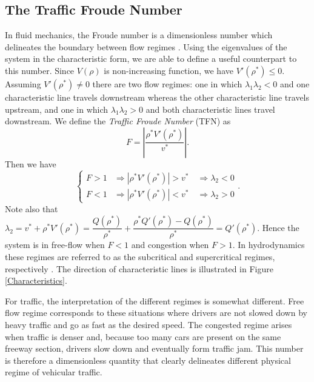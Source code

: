 \documentclass[5p,twocolumn]{elsarticle}
\begin{document}
\subsection{The Traffic Froude Number}
In fluid mechanics, the Froude number is a dimensionless number which delineates the boundary between flow regimes \cite{Sturm, litrico2009modeling}. Using the eigenvalues of the system in the characteristic form, we are able to define a useful counterpart to this number.
Since $V(\rho)$ is non-increasing function, we have $V'(\rho^*) \leq 0$. Assuming $V'(\rho^*) \neq 0$ there are two flow regimes: one in which $\lambda_1 \lambda_2 < 0$ and one characteristic line travels downstream whereas the other characteristic line travels upstream, and one in which $\lambda_1 \lambda_2 > 0$ and both characteristic lines travel downstream. We define the \textit{Traffic Froude Number} (TFN) as
\begin{equation}
F = \left\lvert\dfrac{\rho^*V'( \rho^*)}{v^*}\right\rvert.
\end{equation}
Then we have
\begin{equation*}
\begin{cases}
F > 1 &\Rightarrow |\rho^*V'(\rho^*)| > v^* \quad \Rightarrow \lambda_2  <0 \\
F < 1 &\Rightarrow |\rho^*V'(\rho^*)| < v^* \quad \Rightarrow \lambda_2 > 0
\end{cases}.
\end{equation*}
Note also that $\lambda_2 = v^* + \rho^* V'( \rho^*) = \dfrac{Q(\rho^*)}{\rho^*} + \dfrac{\rho^*Q'(\rho^*)-Q(\rho^*)}{\rho^*} = Q'(\rho^*)$. Hence the system is in free-flow when $F<1$ and congestion when $F>1$. In hydrodynamics these regimes are referred to as the subcritical and supercritical regimes, respectively \cite{litrico2009modeling}. The direction of characteristic lines is illustrated in Figure \ref{Characteristics}.

For traffic, the interpretation of the different regimes is somewhat different. Free flow regime corresponds to these situations where drivers are not slowed down by heavy traffic and go as fast as the desired speed. The congested regime arises when traffic is denser and, because too many cars are present on the same freeway section, drivers slow down and eventually form traffic jam. This number is therefore a dimensionless quantity that clearly delineates different physical regime of vehicular traffic.
\end{document}
